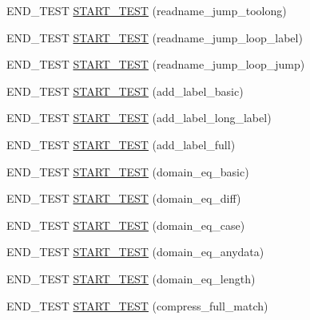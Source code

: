 \begin{DoxyCompactItemize}
E\+N\+D\+\_\+\+T\+E\+ST \hyperlink{openmote-cc2538_2lwip_2test_2unit_2mdns_2test__mdns_8c_aaf86d405b8460e0bbea21efb6028d168}{S\+T\+A\+R\+T\+\_\+\+T\+E\+ST} (readname\+\_\+jump\+\_\+toolong)
\item 
E\+N\+D\+\_\+\+T\+E\+ST \hyperlink{openmote-cc2538_2lwip_2test_2unit_2mdns_2test__mdns_8c_ac05b74aba2212122842afe5379a10dfe}{S\+T\+A\+R\+T\+\_\+\+T\+E\+ST} (readname\+\_\+jump\+\_\+loop\+\_\+label)
\item 
E\+N\+D\+\_\+\+T\+E\+ST \hyperlink{openmote-cc2538_2lwip_2test_2unit_2mdns_2test__mdns_8c_a31b6fa7b1d73c82e542ca1b15fe52723}{S\+T\+A\+R\+T\+\_\+\+T\+E\+ST} (readname\+\_\+jump\+\_\+loop\+\_\+jump)
\item 
E\+N\+D\+\_\+\+T\+E\+ST \hyperlink{openmote-cc2538_2lwip_2test_2unit_2mdns_2test__mdns_8c_ac46b025c8463e580db2e9ad5109bc350}{S\+T\+A\+R\+T\+\_\+\+T\+E\+ST} (add\+\_\+label\+\_\+basic)
\item 
E\+N\+D\+\_\+\+T\+E\+ST \hyperlink{openmote-cc2538_2lwip_2test_2unit_2mdns_2test__mdns_8c_a7cdfddf1d8500f2fa1cfd7be6e30a933}{S\+T\+A\+R\+T\+\_\+\+T\+E\+ST} (add\+\_\+label\+\_\+long\+\_\+label)
\item 
E\+N\+D\+\_\+\+T\+E\+ST \hyperlink{openmote-cc2538_2lwip_2test_2unit_2mdns_2test__mdns_8c_a90ac315f658d03d419d38d54bb690ddb}{S\+T\+A\+R\+T\+\_\+\+T\+E\+ST} (add\+\_\+label\+\_\+full)
\item 
E\+N\+D\+\_\+\+T\+E\+ST \hyperlink{openmote-cc2538_2lwip_2test_2unit_2mdns_2test__mdns_8c_a590cb2eabc9b1371cc3c7a16a1faf5ec}{S\+T\+A\+R\+T\+\_\+\+T\+E\+ST} (domain\+\_\+eq\+\_\+basic)
\item 
E\+N\+D\+\_\+\+T\+E\+ST \hyperlink{openmote-cc2538_2lwip_2test_2unit_2mdns_2test__mdns_8c_a88a51b1d61be6bca72f39c2e0e23688c}{S\+T\+A\+R\+T\+\_\+\+T\+E\+ST} (domain\+\_\+eq\+\_\+diff)
\item 
E\+N\+D\+\_\+\+T\+E\+ST \hyperlink{openmote-cc2538_2lwip_2test_2unit_2mdns_2test__mdns_8c_ab97b910aa04e1a1a1438f9ab4110aefb}{S\+T\+A\+R\+T\+\_\+\+T\+E\+ST} (domain\+\_\+eq\+\_\+case)
\item 
E\+N\+D\+\_\+\+T\+E\+ST \hyperlink{openmote-cc2538_2lwip_2test_2unit_2mdns_2test__mdns_8c_a7abe899cbdff5e9fac07232c4381db68}{S\+T\+A\+R\+T\+\_\+\+T\+E\+ST} (domain\+\_\+eq\+\_\+anydata)
\item 
E\+N\+D\+\_\+\+T\+E\+ST \hyperlink{openmote-cc2538_2lwip_2test_2unit_2mdns_2test__mdns_8c_ab5b4f30f882152f803446cffdd64081f}{S\+T\+A\+R\+T\+\_\+\+T\+E\+ST} (domain\+\_\+eq\+\_\+length)
\item 
E\+N\+D\+\_\+\+T\+E\+ST \hyperlink{openmote-cc2538_2lwip_2test_2unit_2mdns_2test__mdns_8c_ae82725c9f724f04df90f513eded82f62}{S\+T\+A\+R\+T\+\_\+\+T\+E\+ST} (compress\+\_\+full\+\_\+match)

\end{DoxyCompactItemize}

